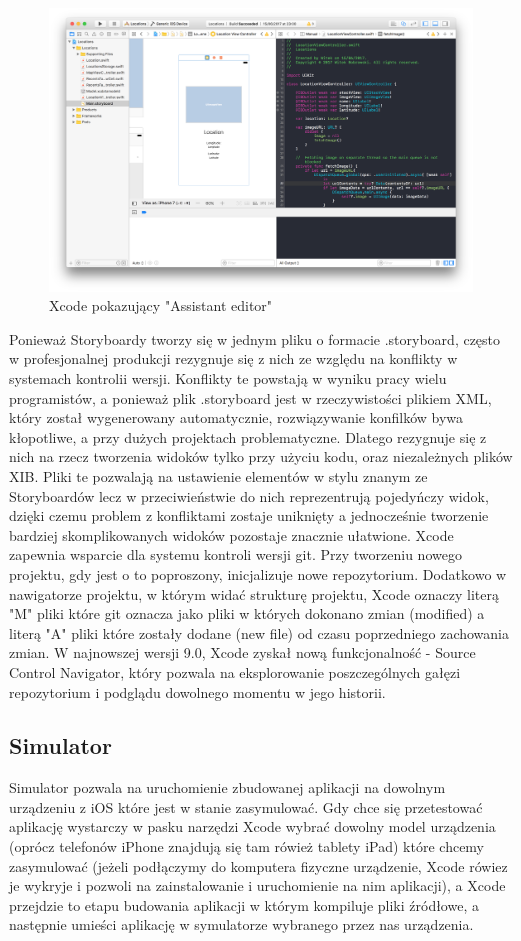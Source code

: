 \begin{figure}[ht!]
  \centering
  \includegraphics[width=120mm]{images/chapter-2-image-2-xcode.png}
  \caption{Xcode pokazujący "Assistant editor"}
  \label{chapter-2-image-2-xcode}
\end{figure}

Ponieważ Storyboardy tworzy się w jednym pliku o formacie .storyboard, często w profesjonalnej produkcji rezygnuje się z nich ze względu na konflikty w systemach kontrolii wersji. Konflikty te powstają w wyniku pracy wielu programistów, a ponieważ plik .storyboard jest w rzeczywistości plikiem XML, który został wygenerowany automatycznie, rozwiązywanie konfilków bywa kłopotliwe, a przy dużych projektach problematyczne. Dlatego rezygnuje się z nich na rzecz tworzenia widoków tylko przy użyciu kodu, oraz niezależnych plików XIB. Pliki te pozwalają na ustawienie elementów w stylu znanym ze Storyboardów lecz w przeciwieństwie do nich reprezentrują pojedyńczy widok, dzięki czemu problem z konfliktami zostaje uniknięty a jednocześnie tworzenie bardziej skomplikowanych widoków pozostaje znacznie ułatwione. Xcode zapewnia wsparcie dla systemu kontroli wersji git. Przy tworzeniu nowego projektu, gdy jest o to poproszony, inicjalizuje nowe repozytorium. Dodatkowo w nawigatorze projektu, w którym widać strukturę projektu, Xcode oznaczy literą "M" pliki które git oznacza jako pliki w których dokonano zmian (modified) a literą "A" pliki które zostały dodane (new file) od czasu poprzedniego zachowania zmian.
W najnowszej wersji 9.0, Xcode zyskał nową funkcjonalność - Source Control Navigator, który pozwala na eksplorowanie poszczególnych gałęzi repozytorium i podglądu dowolnego momentu w jego historii.

\subsection{Simulator}
Simulator pozwala na uruchomienie zbudowanej aplikacji na dowolnym urządzeniu z iOS które jest w stanie zasymulować. Gdy chce się przetestować aplikację wystarczy w pasku narzędzi Xcode wybrać dowolny model urządzenia (oprócz telefonów iPhone znajdują się tam rówież tablety iPad) które chcemy zasymulować (jeżeli podłączymy do komputera fizyczne urządzenie, Xcode rówiez je wykryje i pozwoli na zainstalowanie i uruchomienie na nim aplikacji), a Xcode przejdzie to etapu budowania aplikacji w którym kompiluje pliki źródłowe, a następnie umieści aplikację w symulatorze wybranego przez nas urządzenia.


